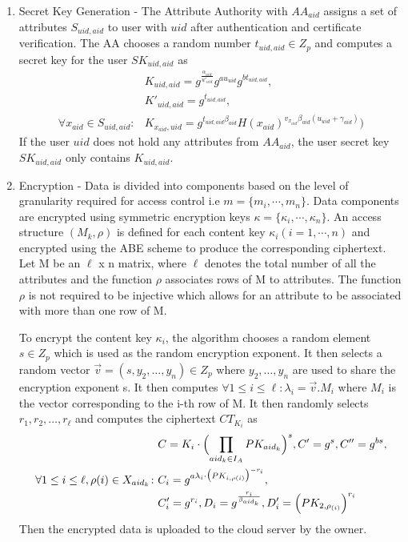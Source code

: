 \begin{enumerate}
	\item Secret Key Generation - The Attribute Authority with $ AA_{aid} $ assigns a set of attributes $ S_{uid,aid} $ to user with $ uid $ after authentication and certificate verification. The AA chooses a random number $ t_{uid,aid} \in Z_{p} $ and computes a secret key for the user $SK_{uid,aid}$ as
	\begin{align*}
	&K_{uid,aid} = g^{\frac{\alpha_{aid}}{u'_{uid}}}g^{au_{uid}}g^{bt_{uid,aid}},\\ &K'_{uid,aid} = g^{t_{uid,aid}}, \\
	\forall x_{aid} \in S_{uid,aid} \colon &K_{x_{aid},uid} = g^{t_{uid,aid}\beta_{aid}}H(x_{aid})^{v_{x_{aid}}\beta_{aid}(u_{uid} + \gamma_{aid})})
	\end{align*}
	If the user $ uid $ does not hold any attributes from $ AA_{aid} $, the user secret key $ SK_{uid,aid} $ only contains $ K_{uid,aid} $.
	
	\item Encryption - Data is divided into components based on the level of granularity required for access control i.e $ m = \{m_{i}, \cdots, m_{n}\} $. Data components are encrypted using symmetric encryption keys $ \kappa = \{\kappa_{i}, \cdots, \kappa_{n}\} $. An access structure $ (M_{k}, \rho) $ is defined for each content key $ \kappa_{i} (i = 1, \cdots, n) $ and encrypted using the ABE scheme to produce the corresponding ciphertext. Let M be an $\ell$ x n matrix, where $\ell$ denotes the total number of all the attributes and the function $ \rho $ associates rows of M to attributes. The function $\rho$ is not required to be injective which allows for an attribute to be associated with more than one row of M.
	
	To encrypt the content key $\kappa_{i}$, the algorithm chooses a random element $ s \in Z_{p} $ which is used as the random encryption exponent. It then selects a random vector $ \vec{v} = (s, y_{2},\ldots,y_{n}) \in Z_{p} $ where $ y_{2},\ldots,y_{n} $ are used to share the encryption exponent s. It then computes $ \forall 1 \leq i \leq \ell: \lambda_{i} = \vec{v}.M_{i} $ where $ M_{i} $ is the vector corresponding to the i-th row of M. It then randomly selects $ r_{1},r_{2},\ldots,r_{\ell} $ and computes the ciphertext $CT_{K_{i}}$ as	
	\begin{align*}
	&C = K_{i}\cdot\Bigl(\prod\limits_{aid_{k} \in I_{A}}PK_{aid_{k}}\Bigl)^{s}, C' = g^{s}, C'' = g^{bs},\\
	\forall 1 \leq i \leq \ell, \rho(i) \in X_{aid_{k}} \colon &C_{i} = g^{a\lambda_{i}\cdot\bigl(PK_{i,\rho(i)}\bigl)^{-r_{i}}},\\ &C'_{i} = g^{r_{i}},D_{i} = g^{\frac{r_{i}}{\beta_{aid_k}}}, D'_{i} = \Bigl(PK_{2,\rho_{(i)}}\Bigl)^{r_{i}}
	\end{align*}
	Then the encrypted data is uploaded to the cloud server by the owner.
	

\end{enumerate}
